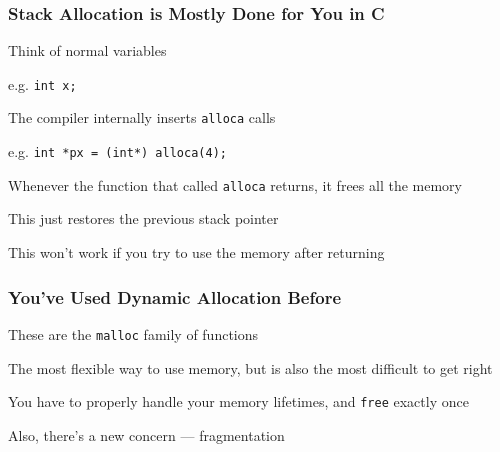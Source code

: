   \begin{frame}
    \frametitle{Stack Allocation is Mostly Done for You in C}

    Think of normal variables

    \hspace{2em} e.g. \lstinline|int x;|

    \vspace{2em}

    The compiler internally inserts \lstinline|alloca| calls

    \hspace{2em} e.g. \lstinline|int *px = (int*) alloca(4);|

    \vspace{2em}

    Whenever the function that called \lstinline|alloca| returns, it
    frees all the memory

    \hspace{2em} This just restores the previous stack pointer

    \vspace{2em}

    This won't work if you try to use the memory after returning
  \end{frame}

  \begin{frame}
    \frametitle{You've Used Dynamic Allocation Before}

    These are the \lstinline|malloc| family of functions

    \vspace{2em}

    The most flexible way to use memory, but is also the most difficult to get
    right

    \vspace{2em}

    You have to properly handle your memory lifetimes, and \lstinline|free|
    exactly once

    \vspace{2em}

    Also, there's a new concern --- fragmentation
  \end{frame}

